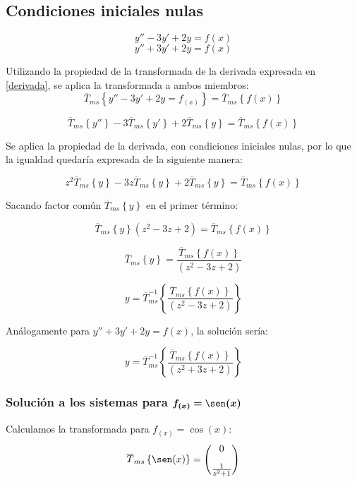 \documentclass[12pt]{article}
\begin{document}
\subsection{Condiciones iniciales nulas}
\label{condiciones_iniciales_nulas}
$$y''-3y'+2y=f(x)$$
$$
y''+3y'+2y=f(x)
$$

Utilizando la propiedad de la transformada de la derivada expresada en \ref{derivada}, se aplica la transformada a ambos miembros:
$$
\overline{T}_{ms}\left\{y''-3y'+2y=f_{(x)}\right\} = \overline{T}_{ms}\left\{f(x)\right\}
$$

$$
\overline{T}_{ms}\left\{y''\right\} -3\overline{T}_{ms}\left\{y'\right\} +2\overline{T}_{ms}\left\{y\right\} = \overline{T}_{ms}\left\{f(x)\right\}
$$

Se aplica la propiedad de la derivada, con condiciones iniciales nulas, por lo que la igualdad quedaría expresada de la siguiente manera:


$$z^2 \overline{T}_{ms}\left\{y\right\} - 3z\overline{T}_{ms}\left\{y\right\}+2\overline{T}_{ms}\left\{y\right\} =\overline{T}_{ms}\left\{f(x)\right\}
$$

Sacando factor común $\overline{T}_{ms}\left\{y\right\}$ en el primer término:

$$
\overline{T}_{ms}\left\{y\right\} \left( z^2 - 3z + 2\right) = \overline{T}_{ms}\left\{f(x)\right\}
$$

$$
\overline{T}_{ms}\left\{y\right\} = \frac{\overline{T}_{ms}\left\{f(x)\right\}}{\left( z^2 - 3z + 2\right) }
$$


$$
y =\overline{T}_{ms}^{-1}\left\{ \frac{\overline{T}_{ms}\left\{f(x)\right\}}{\left( z^2 - 3z + 2\right) }\right\}
$$


Análogamente para $y''+3y'+2y=f(x)$, la solución sería:


$$
y =\overline{T}_{ms}^{-1}\left\{ \frac{\overline{T}_{ms}\left\{f(x)\right\}}{\left( z^2 + 3z + 2\right) }\right\}
$$

\subsubsection{Solución a los sistemas para $\bm{ f_{(x)}=\sen(x)}$}

Calculamos la transformada para $f_{(x)} = \cos(x)$:
$$
\overline{T}_{ms}\left\{\sen(x)\right\} = \begin{pmatrix}
0\\[0.3cm]
\frac{1}{z^2+1}
\end{pmatrix}
$$
\end{document}
